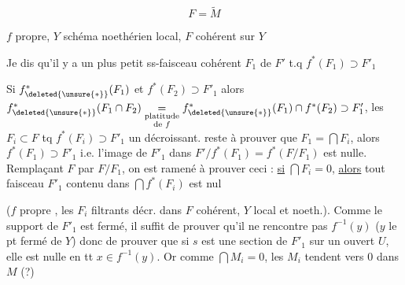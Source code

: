 

\[
F=\widetilde M
\]

$f$  propre, $Y$ schéma noethérien local, $F$ cohérent sur $Y$


 Je dis qu'il y a un plus petit ss-faisceau cohérent $F_1$ de $F'$ t.q $f^*(F_1)\supset F'_1$


Si $f_{\deleted{\unsure{*}}}^*(F_1)$ et $f^*(F_2)\supset F'_1$ alors $f_{\deleted{\unsure{*}}}^*(F_1\cap F_2)\underset{\substack{\text{platitude}\\\text{de }f}}{=}f_{\deleted{\unsure{*}}}^*(F_1)\cap f^*(F_2)\supset F'_1$, les $F_i\subset F$ tq $f^*(F_i)\supset F'_1$  un  décroissant.  reste à prouver que $F_1=\bigcap F_i$, alors $f^*(F_1)\supset F'_1$ i.e. l'image de $F'_1$ dans $F'/f^*(F_1)=f^*(F/F_1)$ est nulle. Remplaçant $F$ par $F/F_1$, on est ramené à prouver ceci : \uline{si} $\bigcap F_i=0$, \uline{alors} tout faisceau  $F'_1$ contenu dans $\bigcap f^*(F_i)$ est nul



 ($f$ propre , les $F_i$ filtrants décr. dans $F$ cohérent, $Y$ local et noeth.).  Comme le support de  $F'_1$ est fermé, il suffit de prouver qu'il ne rencontre pas $f^{-1}(y)$ ($y$ le pt fermé de $Y$) donc de prouver que si $s$ est une section de $F'_1$ sur un ouvert $U$, elle est nulle en tt $x\in f^{-1}(y)$. Or comme  $\bigcap M_i=0$, les $M_i$ tendent vers $0$ dans $M$ (?)


